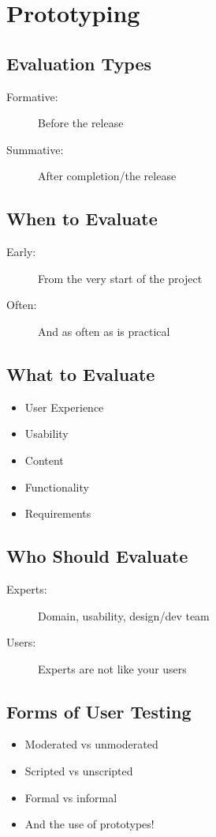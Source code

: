 \section{Prototyping}
\subsection{Evaluation Types}
\begin{description}
	\item[Formative:] Before the release
	\item[Summative:] After completion/the release	
\end{description}

\subsection{When to Evaluate}
\begin{description}
	\item[Early:] From the very start of the project
	\item[Often:] And as often as is practical
\end{description}

\subsection{What to Evaluate}
\begin{itemize}
	\item User Experience
	\item Usability
	\item Content
	\item Functionality
	\item Requirements	
\end{itemize}

\subsection{Who Should Evaluate}
\begin{description}
	\item[Experts:] Domain, usability, design/dev team
	\item[Users:] Experts are not like your users
\end{description}

\subsection{Forms of User Testing}
\begin{itemize}
	\item Moderated vs unmoderated
	\item Scripted vs unscripted
	\item Formal vs informal
	\item And the use of prototypes!	
\end{itemize}

